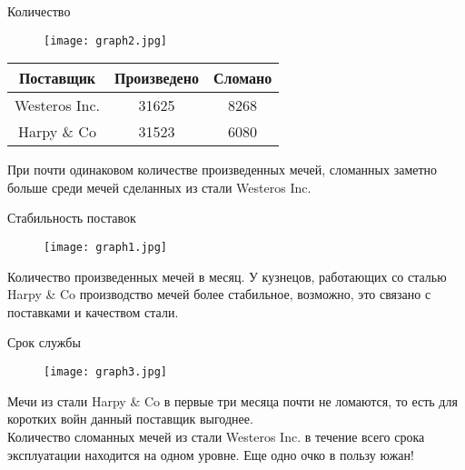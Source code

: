 \documentclass{beamer}
\begin{document}
    \begin{frame}{Количество}
        \begin{figure}
            \centering
            \texttt{[image: graph2.jpg]}
        \end{figure}
        
        \begin{table}[H]
            \begin{right}
                \begin{tabular}{|c|c|c|}
                    \hline
                    Поставщик & Произведено & Сломано \\
                    \hline
                    Westeros Inc. & 31625 & 8268 \\
                    \hline
                    Harpy \& Co & 31523 & 6080 \\
                    \hline
                \end{tabular}
            \end{right}
        \end{table} 
        
        При почти одинаковом количестве произведенных мечей, сломанных заметно больше среди мечей сделанных из стали Westeros Inc.
    \end{frame}
    
    \begin{frame}{Стабильность поставок}
        \begin{figure}
            \centering
            \texttt{[image: graph1.jpg]}
        \end{figure}
        Количество произведенных мечей в месяц. У кузнецов, работающих со сталью Harpy \& Co производство мечей более стабильное, возможно, это связано с поставками и качеством стали. 
    \end{frame}
    
    \begin{frame}{Срок службы}
        \begin{figure}
            \centering
            \texttt{[image: graph3.jpg]}
        \end{figure}
        Мечи из стали Harpy \& Co в первые три месяца почти не ломаются, то есть для коротких войн данный поставщик выгоднее.\\
        Количество сломанных мечей из стали Westeros Inc. в течение всего срока эксплуатации находится на одном уровне.
        Еще одно очко в пользу южан!
    \end{frame}
    
\end{document}
